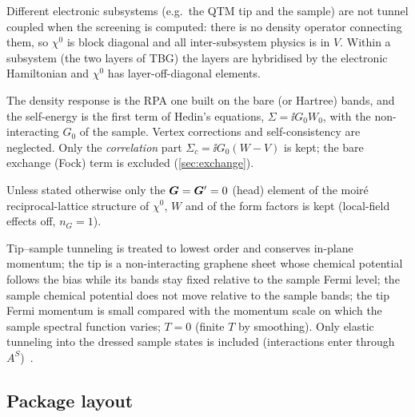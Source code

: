 \begin{assumption}\label{as:decoupled}
Different electronic subsystems (e.g.\ the QTM tip and the sample) are not tunnel coupled when the
screening is computed: there is no density operator connecting them, so $\chi^0$ is block diagonal and all
inter-subsystem physics is in $V$. Within a subsystem (the two layers of TBG) the layers are hybridised by
the electronic Hamiltonian and $\chi^0$ has layer-off-diagonal elements.
\end{assumption}

\begin{assumption}\label{as:gw}
The density response is the RPA one built on the bare (or Hartree) bands, and the self-energy is the first
term of Hedin's equations, $\Sigma=\ii G_0W_0$, with the non-interacting $G_0$ of the sample. Vertex
corrections and self-consistency are neglected. Only the \emph{correlation} part
$\Sigma_c=\ii G_0(W-V)$ is kept; the bare exchange (Fock) term is excluded (\cref{sec:exchange}).
\end{assumption}

\begin{assumption}\label{as:head}
Unless stated otherwise only the $\bm G=\bm G'=0$ (head) element of the moir\'e reciprocal-lattice structure of
$\chi^0$, $W$ and of the form factors is kept (local-field effects off, $n_G=1$).
\end{assumption}

\begin{assumption}\label{as:qtm}
Tip--sample tunneling is treated to lowest order and conserves in-plane momentum; the tip is a non-interacting
graphene sheet whose chemical potential follows the bias while its bands stay fixed relative to the sample Fermi
level; the sample chemical potential does not move relative to the sample bands; the tip Fermi momentum is small
compared with the momentum scale on which the sample spectral function varies; $T=0$ (finite $T$ by smoothing).
Only elastic tunneling into the dressed sample states is included (interactions enter through $A^S$)~\cite{Wei2025}.
\end{assumption}

\subsection{Package layout}

